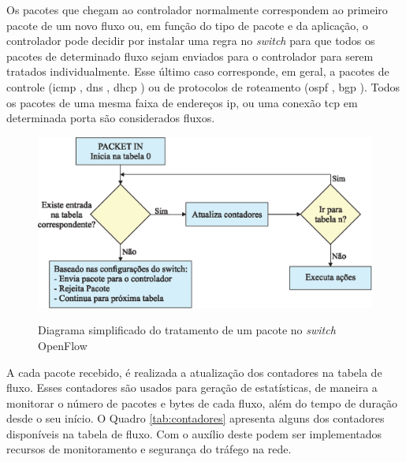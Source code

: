 Os pacotes que chegam ao controlador normalmente correspondem ao primeiro pacote de um novo fluxo ou, em função do tipo de pacote e da aplicação, o controlador pode decidir por instalar uma regra no \textit{switch} para que todos os pacotes de determinado fluxo sejam enviados para o controlador para serem tratados individualmente. Esse último caso corresponde, em geral, a pacotes de controle  (\gls{icmp} \cite{RFC0792}, \gls{dns} \cite{RFC7719}, \gls{dhcp} \cite{RFC2131}) ou de protocolos de roteamento (\gls{ospf} \cite{RFC2328}, \gls{bgp} \cite{RFC4271}).
Todos os pacotes de uma mesma faixa de endereços \gls{ip}, ou uma conexão \gls{tcp} em determinada porta são considerados fluxos.

\begin{figure}[H]
  \centering
  \caption{Diagrama simplificado do tratamento de um pacote no \textit{switch} OpenFlow}
  \includegraphics[width=.80\textwidth]{images/flow.eps}
  \label{fig:fluxo-tmp}
\end{figure}
\FloatBarrier

A cada pacote recebido, é realizada a atualização dos contadores na tabela de fluxo.
Esses contadores são usados para geração de estatísticas, de maneira a monitorar o número de pacotes e bytes de cada fluxo, além do tempo de duração desde o seu início. O Quadro \ref{tab:contadores} apresenta alguns dos contadores disponíveis na tabela de fluxo. Com o auxílio deste podem ser implementados recursos de monitoramento e segurança do tráfego na rede.

